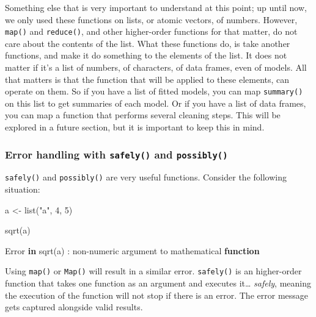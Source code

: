 \documentclass[
]{article}
\newenvironment{Shaded}{\begin{snugshade}}{\end{snugshade}}
\newcommand{\ControlFlowTok}[1]{\textcolor[rgb]{0.13,0.29,0.53}{\textbf{#1}}}
\newcommand{\DecValTok}[1]{\textcolor[rgb]{0.00,0.00,0.81}{#1}}
\newcommand{\FunctionTok}[1]{\textcolor[rgb]{0.00,0.00,0.00}{#1}}
\newcommand{\NormalTok}[1]{#1}
\newcommand{\OtherTok}[1]{\textcolor[rgb]{0.56,0.35,0.01}{#1}}
\newcommand{\SpecialCharTok}[1]{\textcolor[rgb]{0.00,0.00,0.00}{#1}}
\newcommand{\StringTok}[1]{\textcolor[rgb]{0.31,0.60,0.02}{#1}}
\begin{document}
Something else that is very important to understand at this point; up until now, we only used these
functions on lists, or atomic vectors, of numbers. However, \texttt{map()} and \texttt{reduce()}, and other
higher-order functions for that matter, do not care about the contents of the list. What these
functions do, is take another functions, and make it do something to the elements of the list.
It does not matter if it's a list of numbers, of characters, of data frames, even of models. All that
matters is that the function that will be applied to these elements, can operate on them.
So if you have a list of fitted models, you can map \texttt{summary()} on this list to get summaries of
each model. Or if you have a list of data frames, you can map a function that performs several
cleaning steps. This will be explored in a future section, but it is important to keep this in mind.

\hypertarget{error-handling-with-safely-and-possibly}{%
\subsubsection{\texorpdfstring{Error handling with \texttt{safely()} and \texttt{possibly()}}{Error handling with safely() and possibly()}}\label{error-handling-with-safely-and-possibly}}

\texttt{safely()} and \texttt{possibly()} are very useful functions. Consider the following situation:

\begin{Shaded}
\begin{Highlighting}[]
\NormalTok{a }\OtherTok{\textless{}{-}} \FunctionTok{list}\NormalTok{(}\StringTok{"a"}\NormalTok{, }\DecValTok{4}\NormalTok{, }\DecValTok{5}\NormalTok{)}

\FunctionTok{sqrt}\NormalTok{(a)}
\end{Highlighting}
\end{Shaded}

\begin{Shaded}
\begin{Highlighting}[]
\NormalTok{Error }\ControlFlowTok{in} \FunctionTok{sqrt}\NormalTok{(a) }\SpecialCharTok{:}\NormalTok{ non}\SpecialCharTok{{-}}\NormalTok{numeric argument to mathematical }\ControlFlowTok{function}
\end{Highlighting}
\end{Shaded}

Using \texttt{map()} or \texttt{Map()} will result in a similar error. \texttt{safely()} is an higher-order function that
takes one function as an argument and executes it\ldots{} \emph{safely}, meaning the execution of the function
will not stop if there is an error. The error message gets captured alongside valid results.
\end{document}
